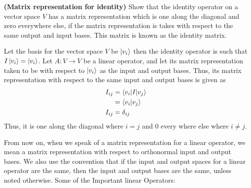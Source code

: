 \begin{example}
    \textbf{(Matrix representation for identity)} Show that the identity operator on a vector space $V$ has a matrix representation which is one along the diagonal and zero everywhere else, if the matrix representation is takes with respect to the same output and input bases. This matrix is known as the identity matrix.

    Let the basis for the vector space $V$ be $\ket{v_i}$ then the identity operator is such that $I\ket{v_i}=\ket{v_i}$. Let $A:V\rightarrow V$ be a linear operator, and let its matrix representation taken to be with respect to $\ket{v_i}$ as the input and output bases. Thus, its matrix representation with respect to the same input and output bases is given as
    \begin{align*}
    I_{ij}&=\braket{v_i|I|v_j}\\
    &=\braket{v_i|v_j}\\
    I_{ij}&=\delta_{ij}
    \end{align*}
    Thus, it is one along the diagonal where $i=j$ and 0 every where else where $i\neq j$.
\end{example}
From now on, when we speak of a matrix representation for a linear operator, we mean a matrix representation with respect to orthonormal input and output bases. We also use the convention that if the input and output spaces for a linear operator are the same,
then the input and output bases are the same, unless noted otherwise.
Some of the Important linear Operators: 
